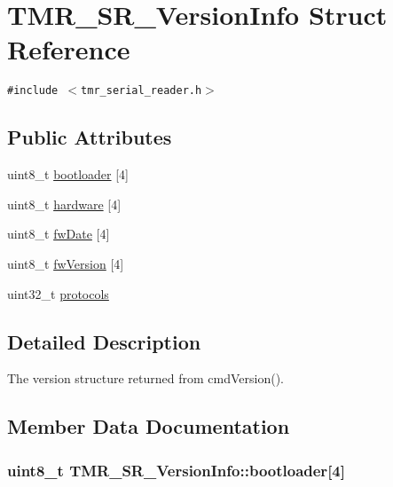 \hypertarget{struct_t_m_r___s_r___version_info}{
\section{TMR\_\-SR\_\-VersionInfo Struct Reference}
\label{struct_t_m_r___s_r___version_info}
}
{\tt \#include $<$tmr\_\-serial\_\-reader.h$>$}

\subsection*{Public Attributes}
\begin{CompactItemize}
\item 
uint8\_\-t \hyperlink{struct_t_m_r___s_r___version_info_cacd06255d7b4de457871a9feeabe9c6}{bootloader} \mbox{[}4\mbox{]}
\item 
uint8\_\-t \hyperlink{struct_t_m_r___s_r___version_info_91cc6cd1fd934b9027a1f33b826af38a}{hardware} \mbox{[}4\mbox{]}
\item 
uint8\_\-t \hyperlink{struct_t_m_r___s_r___version_info_2d709234478b81deceafb90f8796e0d8}{fwDate} \mbox{[}4\mbox{]}
\item 
uint8\_\-t \hyperlink{struct_t_m_r___s_r___version_info_fc879979a4b2a3e7b96531ae830f472e}{fwVersion} \mbox{[}4\mbox{]}
\item 
uint32\_\-t \hyperlink{struct_t_m_r___s_r___version_info_61030bce2394948d99fb3d91bd5dba37}{protocols}
\end{CompactItemize}


\subsection{Detailed Description}
The version structure returned from cmdVersion(). 

\subsection{Member Data Documentation}
\hypertarget{struct_t_m_r___s_r___version_info_cacd06255d7b4de457871a9feeabe9c6}{
\subsubsection[{bootloader}]{\setlength{\rightskip}{0pt plus 5cm}uint8\_\-t {\bf TMR\_\-SR\_\-VersionInfo::bootloader}\mbox{[}4\mbox{]}}}
\label{struct_t_m_r___s_r___version_info_cacd06255d7b4de457871a9feeabe9c6}


